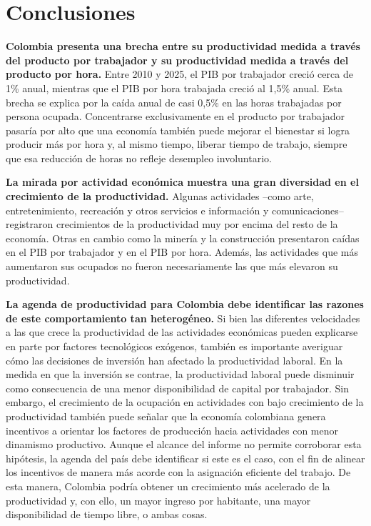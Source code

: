 \section{Conclusiones}

\textbf{Colombia presenta una brecha entre su productividad medida a través del producto por trabajador y su productividad medida a través del producto por hora.} Entre 2010 y 2025, el PIB por trabajador creció cerca de 1\% anual, mientras que el PIB por hora trabajada creció al 1,5\% anual. Esta brecha se explica por la caída anual de casi 0,5\% en las horas trabajadas por persona ocupada. Concentrarse exclusivamente en el producto por trabajador pasaría por alto que una economía también puede mejorar el bienestar si logra producir más por hora y, al mismo tiempo, liberar tiempo de trabajo, siempre que esa reducción de horas no refleje desempleo involuntario.

\textbf{La mirada por actividad económica muestra una gran diversidad en el crecimiento de la productividad.} Algunas actividades  --como arte, entretenimiento, recreación y otros servicios e información y comunicaciones-- registraron crecimientos de la productividad muy por encima del resto de la economía. Otras en cambio como la minería y la construcción presentaron caídas en el PIB por trabajador y en el PIB por hora. Además, las actividades que más aumentaron sus ocupados no fueron necesariamente las que más elevaron su productividad.

\textbf{La agenda de productividad para Colombia debe identificar las razones de este comportamiento tan heterogéneo.} Si bien las diferentes velocidades a las que crece la productividad de las actividades económicas pueden explicarse en parte por factores tecnológicos exógenos, también es importante averiguar cómo las decisiones de inversión han afectado la productividad laboral. En la medida en que la inversión se contrae, la productividad laboral puede disminuir como consecuencia de una menor disponibilidad de capital por trabajador. Sin embargo, el crecimiento de la ocupación en actividades con bajo crecimiento de la productividad también puede señalar que la economía colombiana genera incentivos a orientar los factores de producción hacia actividades con menor dinamismo productivo. Aunque el alcance del informe no permite corroborar esta hipótesis, la agenda del país debe identificar si este es el caso, con el fin de alinear los incentivos de manera más acorde con la asignación eficiente del trabajo. De esta manera, Colombia podría obtener un crecimiento más acelerado de la productividad y, con ello, un mayor ingreso por habitante, una mayor disponibilidad de tiempo libre, o ambas cosas.
